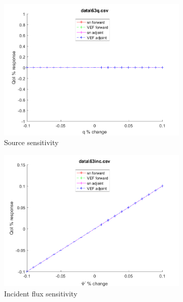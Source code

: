 \documentclass{article}
\begin{document}
\begin{figure}[H]
\label{Case63Sens}
\centering
\begin{subfigure}{.5\textwidth}
  \centering
  \includegraphics[width=.98\linewidth]{IanProposal/figures2/63qSens.png}
  \caption{Source sensitivity}
  \label{fig:sfig1}
\end{subfigure}%
\begin{subfigure}{.5\textwidth}
  \centering
  \includegraphics[width=.98\linewidth]{IanProposal/figures2/63incSens.png}
  \caption{Incident flux sensitivity}
  \label{fig:sfig4}
\end{subfigure}%
\\
\begin{subfigure}{.5\textwidth}
  \centering

\end{subfigure}
\end{figure}
\end{document}
